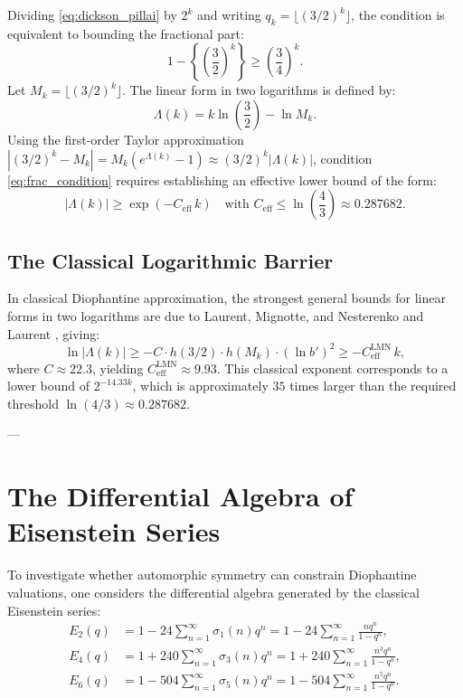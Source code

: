 \documentclass[11pt,reqno]{amsart}
\theoremstyle{definition}
\numberwithin{equation}{section}
\begin{document}
Dividing \eqref{eq:dickson_pillai} by $2^k$ and writing $q_k = \lfloor (3/2)^k \rfloor$, the condition is equivalent to bounding the fractional part:
\begin{equation}
\label{eq:frac_condition}
1 - \left\{ \left(\frac{3}{2}\right)^k \right\} \ge \left(\frac{3}{4}\right)^k.
\end{equation}
Let $M_k = \lfloor (3/2)^k \rfloor$. The linear form in two logarithms is defined by:
\begin{equation}
\Lambda(k) = k \ln\left(\frac{3}{2}\right) - \ln M_k.
\end{equation}
Using the first-order Taylor approximation $|(3/2)^k - M_k| = M_k (e^{\Lambda(k)} - 1) \approx (3/2)^k |\Lambda(k)|$, condition \eqref{eq:frac_condition} requires establishing an effective lower bound of the form:
\begin{equation}
|\Lambda(k)| \ge \exp\left( - C_{\mathrm{eff}} \, k \right) \quad \text{with } C_{\mathrm{eff}} \le \ln\left(\frac{4}{3}\right) \approx 0.287682.
\end{equation}

\subsection{The Classical Logarithmic Barrier}
In classical Diophantine approximation, the strongest general bounds for linear forms in two logarithms are due to Laurent, Mignotte, and Nesterenko \cite{lmn1995} and Laurent \cite{laurent2008}, giving:
\begin{equation}
\ln |\Lambda(k)| \ge - C \cdot h(3/2) \cdot h(M_k) \cdot \left(\ln b'\right)^2 \ge - C_{\mathrm{eff}}^{\mathrm{LMN}} \, k,
\end{equation}
where $C \approx 22.3$, yielding $C_{\mathrm{eff}}^{\mathrm{LMN}} \approx 9.93$. This classical exponent corresponds to a lower bound of $2^{-14.33 k}$, which is approximately $35$ times larger than the required threshold $\ln(4/3) \approx 0.287682$.

---

\section{The Differential Algebra of Eisenstein Series}

To investigate whether automorphic symmetry can constrain Diophantine valuations, one considers the differential algebra generated by the classical Eisenstein series:
\begin{align}
E_2(q) &= 1 - 24 \sum_{n=1}^\infty \sigma_1(n) q^n = 1 - 24 \sum_{n=1}^\infty \frac{n q^n}{1 - q^n}, \\
E_4(q) &= 1 + 240 \sum_{n=1}^\infty \sigma_3(n) q^n = 1 + 240 \sum_{n=1}^\infty \frac{n^3 q^n}{1 - q^n}, \\
E_6(q) &= 1 - 504 \sum_{n=1}^\infty \sigma_5(n) q^n = 1 - 504 \sum_{n=1}^\infty \frac{n^5 q^n}{1 - q^n}.
\end{align}
\end{document}

